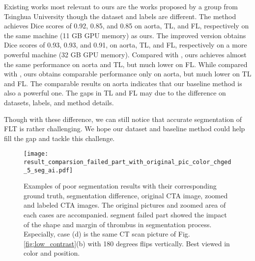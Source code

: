 \documentclass{article}
\begin{document}
Existing works most relevant to ours are the works proposed by a group from Tsinghua University \cite{li2018multi}\cite{cao2019fully} though the dataset and labels are different.
The method \cite{li2018multi} achieves Dice scores of 0.92, 0.85, and 0.85 on aorta, TL, and FL, respectively on the same machine (11 GB GPU memory) as ours.
The improved version \cite{cao2019fully} obtains Dice scores of 0.93, 0.93, and 0.91, on aorta, TL, and FL, respectively on a more powerful machine (32 GB GPU memory).
Compared with \cite{li2018multi}, ours achieves almost the same performance on aorta and TL, but much lower on FL.
While compared with \cite{cao2019fully}, ours obtains comparable performance only on aorta, but much lower on TL and FL. 
The comparable results on aorta indicates that our baseline method is also a powerful one.
The gaps in TL and FL may due to the difference on datasets, labels, and method details.

Though with these difference, we can still notice that accurate segmentation of FLT is rather challenging.
We hope our dataset and baseline method could help fill the gap and tackle this challenge.



\begin{figure}[!t]
\centering
\texttt{[image: result\_comparsion\_failed\_part\_with\_original\_pic\_color\_chged\_5\_seg\_ai.pdf]}
\caption{
Examples of poor segmentation results with their corresponding ground truth, segmentation difference, original CTA image, zoomed and labeled CTA images.
The original pictures and zoomed area of each cases are accompanied.
segment failed part showed the impact of the shape and margin of thrombus in segmentation process.
Especially, case (d) is the same CT scan picture of Fig.\ref{fig:low_contrast}(b) with 180 degrees flips vertically.
Best viewed in color and position.
%
}
\label{fig:poor_seg}
\end{figure}
\end{document}
